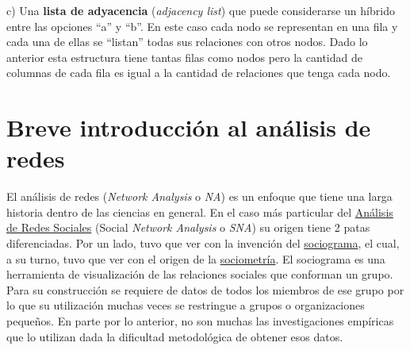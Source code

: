 \documentclass[
  letterpaper,
  DIV=11,
  numbers=noendperiod]{scrreprt}
\begin{document}
c) Una \textbf{lista de adyacencia} (\emph{adjacency list}) que puede
considerarse un híbrido entre las opciones ``a'' y ``b''. En este caso
cada nodo se representan en una fila y cada una de ellas se ``listan''
todas sus relaciones con otros nodos. Dado lo anterior esta estructura
tiene tantas filas como nodos pero la cantidad de columnas de cada fila
es igual a la cantidad de relaciones que tenga cada nodo.

\hypertarget{breve-introducciuxf3n-al-anuxe1lisis-de-redes}{%
\section{Breve introducción al análisis de
redes}\label{breve-introducciuxf3n-al-anuxe1lisis-de-redes}}

El análisis de redes (\emph{Network Analysis} o \emph{NA}) es un enfoque
que tiene una larga historia dentro de las ciencias en general. En el
caso más particular del
\href{https://es.wikipedia.org/wiki/An\%C3\%A1lisis_de_redes\#An\%C3\%A1lisis_de_Redes_Sociales}{Análisis
de Redes Sociales} (Social \emph{Network Analysis} o \emph{SNA}) su
origen tiene 2 patas diferenciadas. Por un lado, tuvo que ver con la
invención del
\href{https://es.wikipedia.org/wiki/Sociograma}{sociograma}, el cual, a
su turno, tuvo que ver con el origen de la
\href{https://es.wikipedia.org/wiki/Sociometr\%C3\%ADa}{sociometría}. El
sociograma es una herramienta de visualización de las relaciones
sociales que conforman un grupo. Para su construcción se requiere de
datos de todos los miembros de ese grupo por lo que su utilización
muchas veces se restringue a grupos o organizaciones pequeños. En parte
por lo anterior, no son muchas las investigaciones empíricas que lo
utilizan dada la dificultad metodológica de obtener esos datos.
\end{document}
